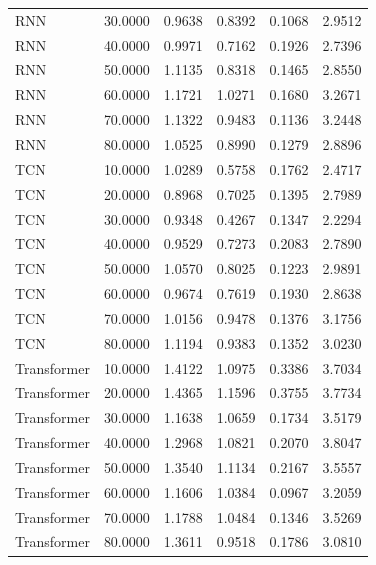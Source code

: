\begin{tabular}{lrrrrr}
RNN & 30.0000 & 0.9638 & 0.8392 & 0.1068 & 2.9512 \\
RNN & 40.0000 & 0.9971 & 0.7162 & 0.1926 & 2.7396 \\
RNN & 50.0000 & 1.1135 & 0.8318 & 0.1465 & 2.8550 \\
RNN & 60.0000 & 1.1721 & 1.0271 & 0.1680 & 3.2671 \\
RNN & 70.0000 & 1.1322 & 0.9483 & 0.1136 & 3.2448 \\
RNN & 80.0000 & 1.0525 & 0.8990 & 0.1279 & 2.8896 \\
TCN & 10.0000 & 1.0289 & 0.5758 & 0.1762 & 2.4717 \\
TCN & 20.0000 & 0.8968 & 0.7025 & 0.1395 & 2.7989 \\
TCN & 30.0000 & 0.9348 & 0.4267 & 0.1347 & 2.2294 \\
TCN & 40.0000 & 0.9529 & 0.7273 & 0.2083 & 2.7890 \\
TCN & 50.0000 & 1.0570 & 0.8025 & 0.1223 & 2.9891 \\
TCN & 60.0000 & 0.9674 & 0.7619 & 0.1930 & 2.8638 \\
TCN & 70.0000 & 1.0156 & 0.9478 & 0.1376 & 3.1756 \\
TCN & 80.0000 & 1.1194 & 0.9383 & 0.1352 & 3.0230 \\
Transformer & 10.0000 & 1.4122 & 1.0975 & 0.3386 & 3.7034 \\
Transformer & 20.0000 & 1.4365 & 1.1596 & 0.3755 & 3.7734 \\
Transformer & 30.0000 & 1.1638 & 1.0659 & 0.1734 & 3.5179 \\
Transformer & 40.0000 & 1.2968 & 1.0821 & 0.2070 & 3.8047 \\
Transformer & 50.0000 & 1.3540 & 1.1134 & 0.2167 & 3.5557 \\
Transformer & 60.0000 & 1.1606 & 1.0384 & 0.0967 & 3.2059 \\
Transformer & 70.0000 & 1.1788 & 1.0484 & 0.1346 & 3.5269 \\
Transformer & 80.0000 & 1.3611 & 0.9518 & 0.1786 & 3.0810 \\
\bottomrule
\end{tabular}
